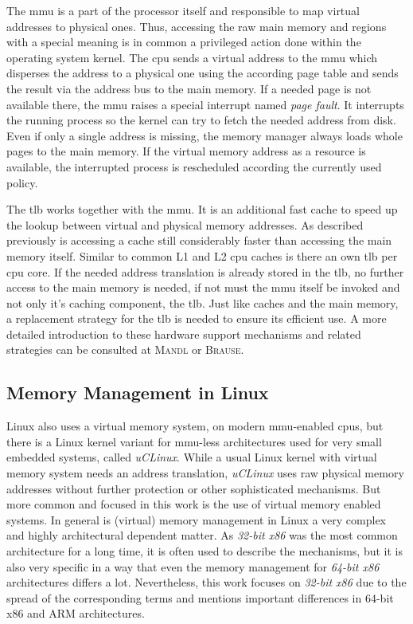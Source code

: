 The \ac{mmu} is a part of the processor itself and responsible to map virtual addresses to physical ones. 
Thus, accessing the raw main memory and regions with a special meaning is in common a privileged action done within the operating system kernel. 
The \ac{cpu} sends a virtual address to the \ac{mmu} which disperses the address to a physical one using the according page table and sends the result via the address bus to the main memory.
If a needed page is not available there, the \ac{mmu} raises a special interrupt named \textit{page fault}.
It interrupts the running process so the kernel can try to fetch the needed address from disk.
Even if only a single address is missing, the memory manager always loads whole pages to the main memory.
If the virtual memory address as a resource is available, the interrupted process is rescheduled according the currently used policy\cite{mandl2014Grundkurs}.

The \ac{tlb} works together with the \ac{mmu}.
It is an additional fast cache to speed up the lookup between virtual and physical memory addresses. 
As described previously is accessing a cache still considerably faster than accessing the main memory itself.
Similar to common L1 and L2 \ac{cpu} caches is there an own \ac{tlb} per \ac{cpu} core.
If the needed address translation is already stored in the \ac{tlb}, no further access to the main memory is needed, if not must the \ac{mmu} itself be invoked and not only it's caching component, the \ac{tlb}.
Just like caches and the main memory, a replacement strategy for the \ac{tlb} is needed to ensure its efficient use.
A more detailed introduction to these hardware support mechanisms and related strategies can be consulted at \textsc{Mandl}\cite{mandl2014Grundkurs} or \textsc{Brause}\cite{brause2017betriebssysteme}.

 
\subsection{Memory Management in Linux}\label{sec:mm:linux}
Linux also uses a virtual memory system, on modern \ac{mmu}-enabled \acp{cpu}, but there is a Linux kernel variant for \ac{mmu}-less architectures used for very small embedded systems, called \textit{uCLinux}.
While a usual Linux kernel with virtual memory system needs an address translation, \textit{uCLinux} uses raw physical memory addresses without further protection or other sophisticated mechanisms.
But more common and focused in this work is the use of virtual memory enabled systems\cite{lfd430}.
In general is (virtual) memory management in Linux a very complex and highly architectural dependent matter.
As \textit{32-bit x86} was the most common architecture for a long time, it is often used to describe the mechanisms, but it is also very specific in a way that even the memory management for \textit{64-bit x86} architectures differs a lot.
Nevertheless, this work focuses on \textit{32-bit x86} due to the spread of the corresponding terms and mentions important differences in 64-bit x86 and ARM architectures.

